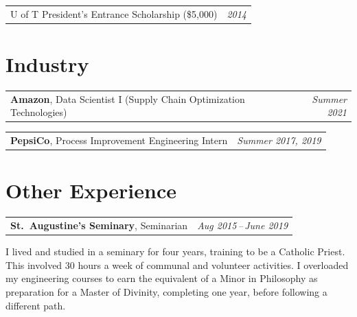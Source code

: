 \documentclass[11pt]{article}
\makeatletter
\newcommand{\cvrow}[2]{%
  \noindent\begin{tabularx}{\textwidth}{@{}X r@{}}
    #1 & \textit{#2}%
  \end{tabularx}\par
}
\makeatother
\begin{document}
\vspace{3pt}

\cvrow{U of T President's Entrance Scholarship (\$5,000)}{2014}

\section{Industry}

\cvrow{\textbf{Amazon}, Data Scientist I (Supply Chain Optimization Technologies)}{Summer 2021}

\vspace{2pt}

\cvrow{\textbf{PepsiCo}, Process Improvement Engineering Intern}{Summer 2017, 2019}

\section{Other Experience}

\cvrow{\textbf{St.\ Augustine's Seminary}, Seminarian}{Aug 2015\,--\,June 2019}

\vspace{2pt}

I lived and studied in a seminary for four years, training to be a Catholic Priest. This involved 30 hours a week of communal and volunteer activities. I overloaded my engineering courses to earn the equivalent of a Minor in Philosophy as preparation for a Master of Divinity, completing one year, before following a different path.
\end{document}
